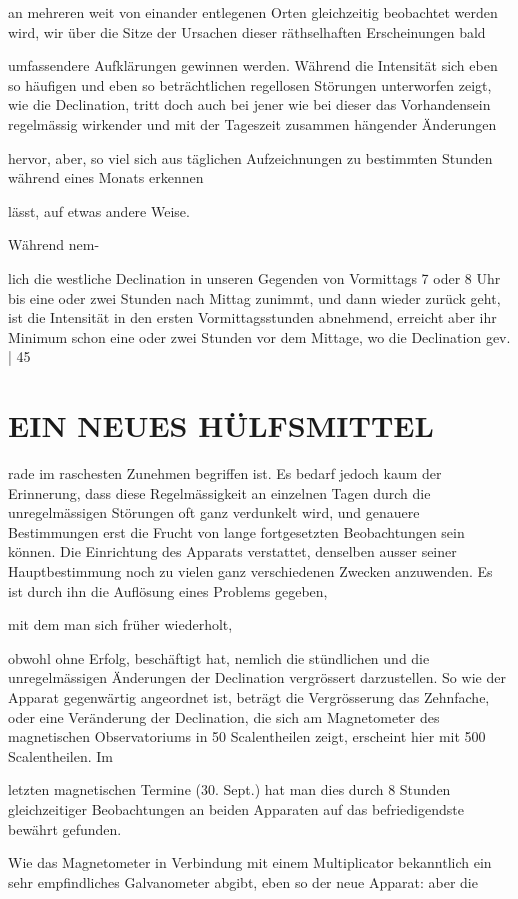 \documentclass[12pt,a4paper]{article}
\begin{document}
an mehreren weit von einander entlegenen Orten gleichzeitig beobachtet werden wird, wir über die Sitze der Ursachen dieser räthselhaften Erscheinungen bald

umfassendere Aufklärungen gewinnen werden. Während die Intensität sich eben so häufigen und eben so beträchtlichen regellosen Störungen unterworfen zeigt, wie die Declination, tritt doch auch bei jener wie bei dieser das Vorhandensein regelmässig wirkender und mit der Tageszeit zusammen hängender Änderungen

hervor, aber, so viel sich aus täglichen Aufzeichnungen zu bestimmten Stunden während eines Monats erkennen

lässt, auf etwas andere Weise.

Während nem-

lich die westliche Declination in unseren Gegenden von Vormittags 7 oder 8 Uhr bis eine oder zwei Stunden nach Mittag zunimmt, und dann wieder zurück geht, ist die Intensität in den ersten Vormittagsstunden abnehmend, erreicht aber ihr Minimum schon eine oder zwei Stunden vor dem Mittage, wo die Declination gev. | 45

\section*{EIN NEUES HÜLFSMITTEL}
rade im raschesten Zunehmen begriffen ist. Es bedarf jedoch kaum der Erinnerung, dass diese Regelmässigkeit an einzelnen Tagen durch die unregelmässigen Störungen oft ganz verdunkelt wird, und genauere Bestimmungen erst die Frucht von lange fortgesetzten Beobachtungen sein können. Die Einrichtung des Apparats verstattet, denselben ausser seiner Hauptbestimmung noch zu vielen ganz verschiedenen Zwecken anzuwenden. Es ist durch ihn die Auflösung eines Problems gegeben,

mit dem man sich früher wiederholt,

obwohl ohne Erfolg, beschäftigt hat, nemlich die stündlichen und die unregelmässigen Änderungen der Declination vergrössert darzustellen. So wie der Apparat gegenwärtig angeordnet ist, beträgt die Vergrösserung das Zehnfache, oder eine Veränderung der Declination, die sich am Magnetometer des magnetischen Observatoriums in 50 Scalentheilen zeigt, erscheint hier mit 500 Scalentheilen. Im

letzten magnetischen Termine (30. Sept.) hat man dies durch 8 Stunden gleichzeitiger Beobachtungen an beiden Apparaten auf das befriedigendste bewährt gefunden.

Wie das Magnetometer in Verbindung mit einem Multiplicator bekanntlich ein sehr empfindliches Galvanometer abgibt, eben so der neue Apparat: aber die
\end{document}
